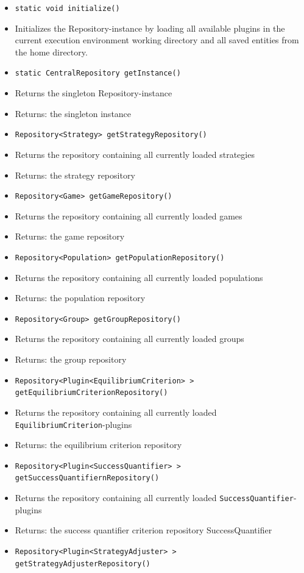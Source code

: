 \documentclass[parskip=full,11pt]{scrartcl}
\begin{document}
\begin{itemize} \itemsep -10pt
	\item \texttt{static void initialize()}
	\item[] Initializes the Repository-instance by loading all available plugins in the current execution environment working directory and all saved entities from the home directory.
	\item \texttt{static CentralRepository getInstance()}
	\item[]Returns the singleton Repository-instance
	\item[] Returns: the singleton instance
	\item \texttt{Repository<Strategy> getStrategyRepository()}
	\item[]Returns the repository containing all currently loaded strategies
	\item[] Returns: the strategy repository
	\item \texttt{Repository<Game> getGameRepository()}
	\item[]Returns the repository containing all currently loaded games
	\item[] Returns: the game repository
	\item \texttt{Repository<Population> getPopulationRepository()}
	\item[]Returns the repository containing all currently loaded populations
	\item[] Returns: the population repository
	\item \texttt{Repository<Group> getGroupRepository()}
	\item[]Returns the repository containing all currently loaded groups
	\item[] Returns: the group repository
	\item \texttt{Repository<Plugin<EquilibriumCriterion>\,> getEquilibriumCriterionRepository()}
	\item[]Returns the repository containing all currently loaded \texttt{EquilibriumCriterion}-plugins
	\item[] Returns: the equilibrium criterion repository
	\item\texttt{Repository<Plugin<SuccessQuantifier>\,> getSuccessQuantifiernRepository()}
	\item[]Returns the repository containing all currently loaded \texttt{SuccessQuantifier}-plugins
	\item[] Returns: the success quantifier criterion repository
	SuccessQuantifier
	\item\texttt{Repository<Plugin<StrategyAdjuster>\,> getStrategyAdjusterRepository()}

\end{itemize}
\end{document}
